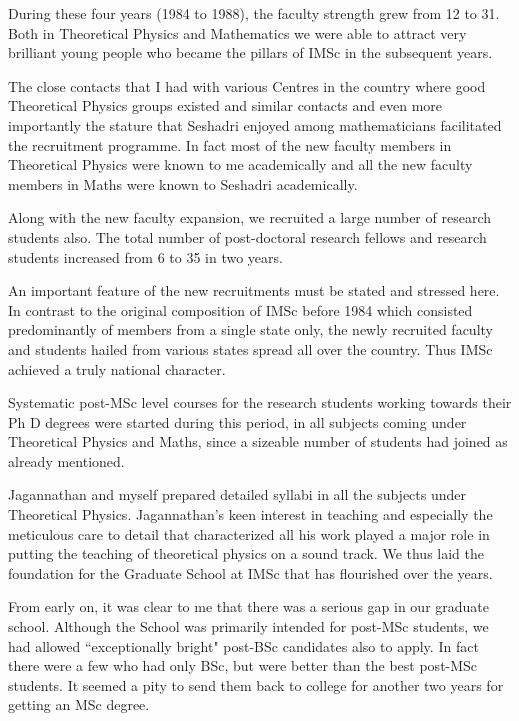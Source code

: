 During these four years (1984 to 1988), the faculty strength grew from 
12 to 31. Both in Theoretical Physics and Mathematics we were able to 
attract very brilliant young people who became the pillars of IMSc in 
the subsequent years.
\smallskip

The close contacts that I had with various Centres in the country where 
good Theoretical Physics groups existed and similar contacts and even 
more importantly the stature that Seshadri enjoyed among mathematicians 
facilitated the recruitment programme. In fact most of the new faculty 
members in Theoretical Physics were known to me academically and all the 
new faculty members in Maths were known to Seshadri academically.
\smallskip

Along with the new faculty expansion, we recruited a large number of 
research students also. The total number of post-doctoral research 
fellows and research students increased from 6 to 35 in two years.
\smallskip

An important feature of the new recruitments must be stated and stressed 
here. In contrast to the original composition of IMSc before 1984 which 
consisted predominantly of members from a single state only, the newly 
recruited faculty and students hailed from various states spread all 
over the country. Thus IMSc achieved a truly national character.
\smallskip

Systematic post-MSc level courses for the research students working 
towards their Ph D degrees were started during this period, in all 
subjects coming under Theoretical Physics and Maths, since a sizeable 
number of students had joined as already mentioned.
\smallskip

Jagannathan and myself prepared detailed syllabi in all the subjects 
under Theoretical Physics. Jagannathan's keen interest in teaching and 
especially the meticulous care to detail that characterized all his work 
played a major role in putting the teaching of theoretical physics on a 
sound track. We thus laid the foundation for the Graduate School at IMSc 
that has flourished over the years.
\smallskip

From early on, it was clear to me that there was a serious gap in our 
graduate school. Although the School was primarily intended for post-MSc 
students, we had allowed ``exceptionally bright" post-BSc candidates also 
to apply. In fact there were a few who had only BSc, but were better than 
the best post-MSc students. It seemed a pity to send them back to 
college for another two years for getting an MSc degree.
\smallskip

